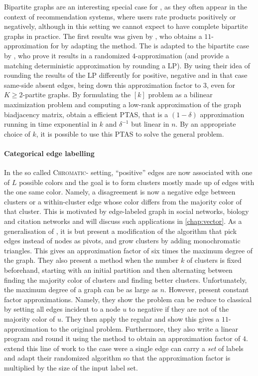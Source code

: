 Bipartite graphs are an interesting special case for \pcc{}, as they often appear in the context of
recommendation systems, where users rate products positively or negatively, although in this setting
we cannot expect to have complete bipartite graphs in practice. The first results was given by
\textcite{Amit04}, who obtains a $11$-approximation for \mind{} by adapting the \regionGrow{} method.
The \ccpivot{} is adapted to the bipartite case by
\textcite{Bipartite12}, who prove it results in a randomized $4$-approximation (and provide a matching
deterministic approximation by rounding a LP). By using their idea of rounding the results of the LP
differently for positive, negative and in that case same-side absent edges, \textcite{Chawla2014}
bring down this approximation factor to $3$, even for $K\geq 2$-partite graphs. By formulating the
\maxa{}$[k]$ problem as a bilinear maximization problem and computing a low-rank approximation of
the graph biadjacency matrix, \textcite{Asteris2016} obtain a efficient PTAS, that is a $(1-\delta)$
approximation running in time exponential in $k$ and $\delta^{-1}$ but linear in $n$. By an
appropriate choice of $k$, it is possible to use this PTAS to solve the general \maxa{} problem.

\paragraph{Categorical edge labelling}

In the so called \textsc{Chromatic}-\pcc{} setting, \enquote{positive} edges are now associated with
one of $L$ possible colors and the goal is to form clusters mostly made up of edges with the one same
color. Namely, a disagreement is now a negative edge between clusters or a within-cluster edge
whose color differs from the majority color of that cluster. This is motivated by edge-labeled graph
in social networks, biology and citation networks and will discuss such applications in
\autoref{chap:vector}. As a generalisation of \pcc{}, it is \NPc{} but \textcite{Bonchi2012a}
present a modification of the \ccpivot{} algorithm that pick edges instead of nodes as pivots, and
grow clusters by adding monochromatic triangles. This gives an approximation factor of six times the
maximum degree of the graph. They also present a method when the number $k$ of clusters is fixed
beforehand, starting with an initial partition and then alternating between finding the majority
color of clusters and finding better clusters. Unfortunately, the maximum degree of a graph can be
as large as $n$. However, \textcite{Anava2015} present constant factor approximations. Namely, they
show the problem can be reduce to classical \pcc{} by setting all edges incident to a node $u$ to
negative if they are not of the majority color of $u$. They then apply the regular \ccpivot{} and
show this gives a $11$-approximation to the original problem. Furthermore, they also write a linear
program and round it using the \regionGrow{} method to obtain an
approximation factor of $4$. \Textcite{multiChromatic15} extend this line of work to the case were a
single edge can carry a \emph{set} of labels and adapt their randomized algorithm so that the
approximation factor is multiplied by the size of the input label set.

